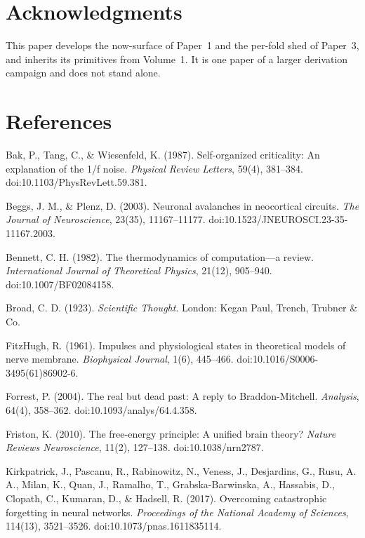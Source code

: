 \documentclass[11pt,oneside]{report}
\theoremstyle{definition}
\theoremstyle{remark}
\newenvironment{reflist}
  {\par\small\setlength{\parindent}{0pt}%
   \setlength{\leftskip}{1.6em}\setlength{\parindent}{-1.6em}%
   \setlength{\parskip}{0.4em}%
   \raggedright\hyphenpenalty=50\exhyphenpenalty=50\relax
   \sloppy}
  {\par}
\begin{document}
\section*{Acknowledgments}

This paper develops the now-surface of Paper~1 and the per-fold shed of
Paper~3, and inherits its primitives from Volume~1. It is one paper of a
larger derivation campaign and does not stand alone.

\section*{References}

\begin{reflist}
Bak, P., Tang, C., \& Wiesenfeld, K. (1987). Self-organized criticality: An explanation of the 1/f noise. \emph{Physical Review Letters}, 59(4), 381--384. doi:10.1103/PhysRevLett.59.381.

Beggs, J. M., \& Plenz, D. (2003). Neuronal avalanches in neocortical circuits. \emph{The Journal of Neuroscience}, 23(35), 11167--11177. doi:10.1523/JNEUROSCI.23-35-11167.2003.

Bennett, C. H. (1982). The thermodynamics of computation---a review. \emph{International Journal of Theoretical Physics}, 21(12), 905--940. doi:10.1007/BF02084158.

Broad, C. D. (1923). \emph{Scientific Thought}. London: Kegan Paul, Trench, Trubner \& Co.

FitzHugh, R. (1961). Impulses and physiological states in theoretical models of nerve membrane. \emph{Biophysical Journal}, 1(6), 445--466. doi:10.1016/S0006-3495(61)86902-6.

Forrest, P. (2004). The real but dead past: A reply to Braddon-Mitchell. \emph{Analysis}, 64(4), 358--362. doi:10.1093/analys/64.4.358.

Friston, K. (2010). The free-energy principle: A unified brain theory? \emph{Nature Reviews Neuroscience}, 11(2), 127--138. doi:10.1038/nrn2787.

Kirkpatrick, J., Pascanu, R., Rabinowitz, N., Veness, J., Desjardins, G., Rusu, A. A., Milan, K., Quan, J., Ramalho, T., Grabska-Barwinska, A., Hassabis, D., Clopath, C., Kumaran, D., \& Hadsell, R. (2017). Overcoming catastrophic forgetting in neural networks. \emph{Proceedings of the National Academy of Sciences}, 114(13), 3521--3526. doi:10.1073/pnas.1611835114.


\end{reflist}
\end{document}
